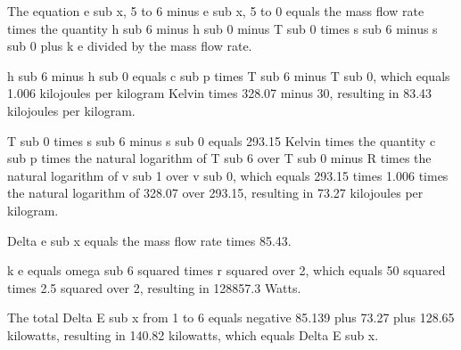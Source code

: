 The equation e sub x, 5 to 6 minus e sub x, 5 to 0 equals the mass flow rate times the quantity h sub 6 minus h sub 0 minus T sub 0 times s sub 6 minus s sub 0 plus k e divided by the mass flow rate.

h sub 6 minus h sub 0 equals c sub p times T sub 6 minus T sub 0, which equals 1.006 kilojoules per kilogram Kelvin times 328.07 minus 30, resulting in 83.43 kilojoules per kilogram.

T sub 0 times s sub 6 minus s sub 0 equals 293.15 Kelvin times the quantity c sub p times the natural logarithm of T sub 6 over T sub 0 minus R times the natural logarithm of v sub 1 over v sub 0, which equals 293.15 times 1.006 times the natural logarithm of 328.07 over 293.15, resulting in 73.27 kilojoules per kilogram.

Delta e sub x equals the mass flow rate times 85.43.

k e equals omega sub 6 squared times r squared over 2, which equals 50 squared times 2.5 squared over 2, resulting in 128857.3 Watts.

The total Delta E sub x from 1 to 6 equals negative 85.139 plus 73.27 plus 128.65 kilowatts, resulting in 140.82 kilowatts, which equals Delta E sub x.